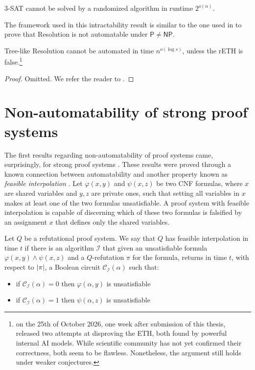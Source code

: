 \begin{conjecture}
    $3$-SAT cannot be solved by a randomized algorithm in runtime $2^{o(n)}$.
\end{conjecture}

The framework used in this intractability result is similar to the one used in  to prove that Resolution is not automatable under $\mathsf{P} \neq \mathsf{NP}$.

\begin{theorem}
    Tree-like Resolution cannot be automated in time $n^{o(\log s)}$, unless the rETH is false.\footnote{on the 25th of October 2026, one week after submission of this thesis, \textcite{openai,anthropic} released two attempts at disproving the ETH, both found by powerful internal AI models. While scientific community has not yet confirmed their correctness, both seem to be flawless. Nonetheless, the argument still holds under weaker conjectures.}
\end{theorem}

\begin{proof}
    Omitted. We refer the reader to \cite{eth_hard_treeres}.
\end{proof}

\section{Non-automatability of strong proof systems}
\label{sec:auto_strong}

The first results regarding non-automatability of proof systems came, surprisingly, for strong proof systems \cite{fis_int_weak_aut,ac0_crypto,kraj_pud_crypto}. These results were proved through a known connection between automatability and another property known as \textit{feasible interpolation} \cite{craig, kraj_fi}. Let $\varphi(x,y)$ and $\psi(x,z)$ be two CNF formulas, where $x$ are shared variables and $y,z$ are private ones, such that setting all variables in $x$ makes at least one of the two formulas unsatisfiable. A proof system with feasible interpolation is capable of discerning which of these two formulas is falsified by an assignment $x$ that defines only the shared variables.

\begin{definition}
    Let $Q$ be a refutational proof system. We say that $Q$ has feasible interpolation in time $t$ if there is an algorithm $\mathcal{I}$ that given an unsatisfiable formula $\varphi(x, y) \land \psi (x, z)$ and a $Q$-refutation $\pi$ for the formula, returns in time $t$, with respect to $\left|\pi\right|$, a Boolean circuit $\mathcal{C}_{\mathcal{I}}(\alpha)$ such that:
    \begin{itemize}
        \item if $\mathcal{C}_{\mathcal{I}}(\alpha) = 0$ then $\varphi(\alpha,y)$ is unsatisfiable
        \item if $\mathcal{C}_{\mathcal{I}}(\alpha) = 1$ then $\psi(\alpha,z)$ is unsatisfiable
    \end{itemize}
\end{definition}

